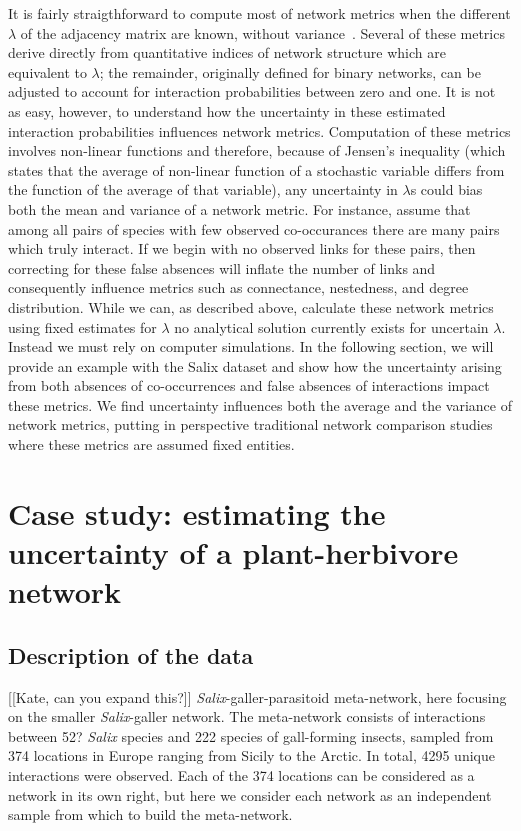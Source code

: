 ﻿\documentclass[12pt]{article}
\begin{document}
    It is fairly straigthforward to compute most of network metrics when the different $\lambda$ of the adjacency matrix are known, without variance~\citep{Poisot2016}. Several of these metrics derive directly from quantitative indices of network structure which are equivalent to $\lambda$; the remainder, originally defined for binary networks, can be adjusted to account for interaction probabilities between zero and one. It is not as easy, however, to understand how the uncertainty in these estimated interaction probabilities influences network metrics. Computation of these metrics involves non-linear functions and therefore, because of Jensen's inequality (which states that the average of non-linear function of a stochastic variable differs from the function of the average of that variable), any uncertainty in $\lambda$s could bias both the mean and variance of a network metric. For instance, assume that among all pairs of species with few observed co-occurances there are many pairs which truly interact.    If we begin with no observed links for these pairs, then correcting for these false absences will inflate the number of links and consequently influence metrics such as connectance, nestedness, and degree distribution. While we can, as described above, calculate these network metrics using fixed estimates for $\lambda$ no analytical solution currently exists for uncertain $\lambda$. Instead we must rely on computer simulations. In the following section, we will provide an example with the Salix dataset and show how the uncertainty arising from both absences of co-occurrences and false absences of interactions impact these metrics. We find uncertainty influences both the average and the variance of network metrics, putting in perspective traditional network comparison studies where these metrics are assumed fixed entities. 

\section*{Case study: estimating the uncertainty of a plant-herbivore network}

    \subsection*{Description of the data}

      [[Kate, can you expand this?]]
      \emph{Salix}-galler-parasitoid meta-network, here focusing on the smaller \emph{Salix}-galler network. The meta-network consists of interactions between 52? \emph{Salix} species and 222 species of gall-forming insects, sampled from 374 locations in Europe ranging from Sicily to the Arctic. In total, 4295 unique interactions were observed. Each of the 374 locations can be considered as a network in its own right, but here we consider each network as an independent sample from which to build the meta-network.
\end{document}
